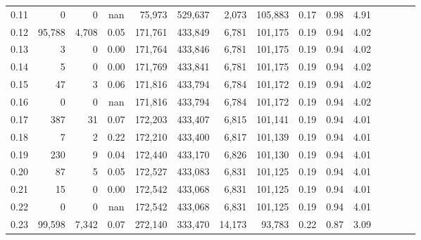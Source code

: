 \begin{tabular}{rrrcrrrrrrrrrrr}
0.11 &       0 &       0 &                                        nan &   75,973 &  529,637 &    2,073 &  105,883 &  0.17 &  0.98 &                         4.91 \\
0.12 &  95,788 &   4,708 &                                       0.05 &  171,761 &  433,849 &    6,781 &  101,175 &  0.19 &  0.94 &                         4.02 \\
0.13 &       3 &       0 &                                       0.00 &  171,764 &  433,846 &    6,781 &  101,175 &  0.19 &  0.94 &                         4.02 \\
0.14 &       5 &       0 &                                       0.00 &  171,769 &  433,841 &    6,781 &  101,175 &  0.19 &  0.94 &                         4.02 \\
0.15 &      47 &       3 &                                       0.06 &  171,816 &  433,794 &    6,784 &  101,172 &  0.19 &  0.94 &                         4.02 \\
0.16 &       0 &       0 &                                        nan &  171,816 &  433,794 &    6,784 &  101,172 &  0.19 &  0.94 &                         4.02 \\
0.17 &     387 &      31 &                                       0.07 &  172,203 &  433,407 &    6,815 &  101,141 &  0.19 &  0.94 &                         4.01 \\
0.18 &       7 &       2 &                                       0.22 &  172,210 &  433,400 &    6,817 &  101,139 &  0.19 &  0.94 &                         4.01 \\
0.19 &     230 &       9 &                                       0.04 &  172,440 &  433,170 &    6,826 &  101,130 &  0.19 &  0.94 &                         4.01 \\
0.20 &      87 &       5 &                                       0.05 &  172,527 &  433,083 &    6,831 &  101,125 &  0.19 &  0.94 &                         4.01 \\
0.21 &      15 &       0 &                                       0.00 &  172,542 &  433,068 &    6,831 &  101,125 &  0.19 &  0.94 &                         4.01 \\
0.22 &       0 &       0 &                                        nan &  172,542 &  433,068 &    6,831 &  101,125 &  0.19 &  0.94 &                         4.01 \\
0.23 &  99,598 &   7,342 &                                       0.07 &  272,140 &  333,470 &   14,173 &   93,783 &  0.22 &  0.87 &                         3.09 \\

\end{tabular}
